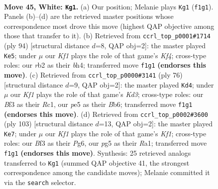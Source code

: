 \documentclass[11pt]{article}
\begin{document}
\clearpage

\begin{figure}[p]\centering
\begin{subfigure}{0.46\textwidth}\centering
\resizebox{\linewidth}{!}{%
\newchessgame
\chessboard[
  setfen={8/6k1/8/4p1p1/5p2/5B2/1r6/5K2 w - - 1 45},
  showmover=false,
  pgfstyle=straightmove, color=movearrow, markmove={f1-g1}
]}
\caption{}
\end{subfigure}\hfill
\begin{subfigure}{0.46\textwidth}\centering
\resizebox{\linewidth}{!}{%
\newchessgame
\chessboard[
  setfen={6k1/8/8/1p6/2p2K1b/2B5/8/8 w - - 0 48},
  showmover=false,
  pgfstyle=straightmove, color=movearrow, markmove={f4-e5}
]}
\caption{}
\end{subfigure}
\\[4pt]
\begin{subfigure}{0.46\textwidth}\centering
\resizebox{\linewidth}{!}{%
\newchessgame
\chessboard[
  setfen={8/8/1Bp1k3/1p6/8/3K4/7r/2R5 w - - 4 39},
  showmover=false,
  pgfstyle=straightmove, color=movearrow, markmove={d3-d4}
]}
\caption{}
\end{subfigure}\hfill
\begin{subfigure}{0.46\textwidth}\centering
\resizebox{\linewidth}{!}{%
\newchessgame
\chessboard[
  setfen={2R2k2/8/6p1/3K2P1/7P/8/8/r7 b - - 2 52},
  showmover=false,
  pgfstyle=straightmove, color=movearrow, markmove={f8-e7}
]}
\caption{}
\end{subfigure}
\caption{\textbf{Move 45, White: \texttt{Kg1}.} (a) Our position; Melanie plays \texttt{Kg1} (\texttt{f1g1}). Panels (b)--(d) are the retrieved master positions whose correspondence most drove this move (highest QAP objective among those that transfer to it). (b) Retrieved from \texttt{ccrl\_top\_p0001\#1714} (ply 94) [structural distance $d$=8, QAP obj=2]: the master played \texttt{Ke5}; under $\mu$ our \emph{Kf1} plays the role of that game's \emph{Kf4}; cross-type roles: our \emph{r}b2 as their \emph{b}h4; transferred move \texttt{f1g1} \textbf{(endorses this move)}. (c) Retrieved from \texttt{ccrl\_top\_p0000\#3141} (ply 76) [structural distance $d$=9, QAP obj=2]: the master played \texttt{Kd4}; under $\mu$ our \emph{Kf1} plays the role of that game's \emph{Kd3}; cross-type roles: our \emph{B}f3 as their \emph{R}c1, our \emph{p}e5 as their \emph{B}b6; transferred move \texttt{f1g1} \textbf{(endorses this move)}. (d) Retrieved from \texttt{ccrl\_top\_p0002\#3600} (ply 103) [structural distance $d$=13, QAP obj=2]: the master played \texttt{Ke7}; under $\mu$ our \emph{Kf1} plays the role of that game's \emph{Kf1}; cross-type roles: our \emph{B}f3 as their \emph{P}g6, our \emph{p}g5 as their \emph{R}a1; transferred move \texttt{f1g1} \textbf{(endorses this move)}. Synthesis: 25 retrieved analogs transferred to \texttt{Kg1} (summed QAP objective 41, the strongest correspondence among the candidate moves); Melanie committed it via the \texttt{search} selector.}
\label{fig:thought-m88}
\end{figure}
\end{document}

